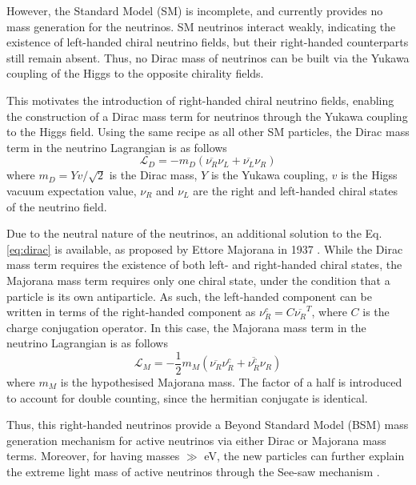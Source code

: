 However, the Standard Model (SM) is incomplete, and currently provides no mass generation for the neutrinos.
SM neutrinos interact weakly, indicating the existence of left-handed chiral neutrino fields, but their right-handed counterparts still remain absent. 
Thus, no Dirac mass of neutrinos can be built via the Yukawa coupling of the Higgs to the opposite chirality fields. 

This motivates the introduction of right-handed chiral neutrino fields, enabling the construction of a Dirac mass term for neutrinos through the Yukawa coupling to the Higgs field.
Using the same recipe as all other SM particles, the Dirac mass term in the neutrino Lagrangian is as follows \cite{Thomson}
\begin{equation}
\mathcal{L}_{D} = -m_{D} (\overline{\nu_{R}}\nu_{L} + \overline{\nu_{L}}\nu_{R}) 
\label{eq:dirac}
\end{equation}
where $m_{D} = Yv/\sqrt{2}$ is the Dirac mass, $Y$ is the Yukawa coupling, $v$ is the Higss vacuum expectation value, $\nu_{R}$ and $\nu_{L}$ are the right and left-handed chiral states of the neutrino field.

Due to the neutral nature of the neutrinos, an additional solution to the Eq. \ref{eq:dirac} is available, as proposed by Ettore Majorana in 1937 \cite{Majorana}.
While the Dirac mass term requires the existence of both left- and right-handed chiral states, the Majorana mass term requires only one chiral state, under the condition that a particle is its own antiparticle.
As such, the left-handed component can be written in terms of the right-handed component as $\nu^{c}_{R}=C\overline{\nu_{R}}^{T}$, where $C$ is the charge conjugation operator.
In this case, the Majorana mass term in the neutrino Lagrangian is as follows \cite{Thomson}
\begin{equation}
	\mathcal{L}_{M} = -\frac{1}{2}m_{M}(\overline{\nu_{R}}\nu_{R}^{c} + \overline{\nu_{R}^{c}}\nu_{R})
\end{equation}
where $m_{M}$ is the hypothesised Majorana mass. 
The factor of a half is introduced to account for double counting, since the hermitian conjugate is identical.

Thus, this right-handed neutrinos provide a Beyond Standard Model (BSM) mass generation mechanism for active neutrinos via either Dirac or Majorana mass terms.
Moreover, for having masses $\gg$ eV, the new particles can further explain the extreme light mass of active neutrinos through the See-saw mechanism \cite{nuMass}.

